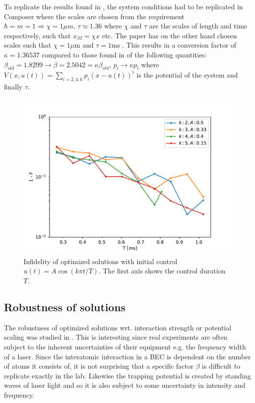\documentclass[a4paper, twocolumn]{revtex4-1}
\begin{document}
To replicate the results found in \cite{QM2Paper}, the system conditions had to be replicated in Composer where the scales are chosen from the requirement $\hbar = m = 1 \Rightarrow \chi = 1\mu m, \, \tau \approx 1.36$ where $\chi$ and $\tau$ are the scales of length and time respectively, such that $x_{SI}=\chi x$ etc. The paper has on the other hand chosen scales such that $\chi = 1 \mu\text{m}$ and $\tau = 1 \text{ms}$ \cite{QEngine}. This results in a conversion factor of $\kappa = 1.36537$ compared to those found in \cite{QEngine} of the following quantities: $\beta_{old} = 1.8299 \rightarrow \beta = 2.5042 = \kappa \beta_{old}$, $p_i \rightarrow \kappa p_i$ where $V(x,u(t)) = \sum_{i=2,4,6} p_i (x-u(t))^i$ is the potential of the system and finally $\tau$. \\

\begin{figure}
	\includegraphics[width=\columnwidth]{graphics/clustering/QM2Clustering.pdf}
	\caption{Infidelity of  optimized solutions with initial control $u(t)=A\cos(k\pi t/T)$. The first axis shows the control duration $T$.}
	\label{fig:Clustering}
\end{figure}

\subsection{\label{subsec:robustness} Robustness of solutions}
The robustness of optimized solutions wrt. interaction strength or potential scaling was studied in \cite{GroupPaper}. This is interesting since real experiments are often subject to the inherent uncertainties of their equipment e.g. the frequency width of a laser. Since the interatomic interaction in a BEC is dependent on the number of atoms it consists of, it is not surprising that a specific factor $\beta$ is difficult to replicate exactly in the lab. Likewise the trapping potential is created by standing waves of laser light and so it is also subject to some uncertainty in intensity and frequency.  \\
\end{document}
